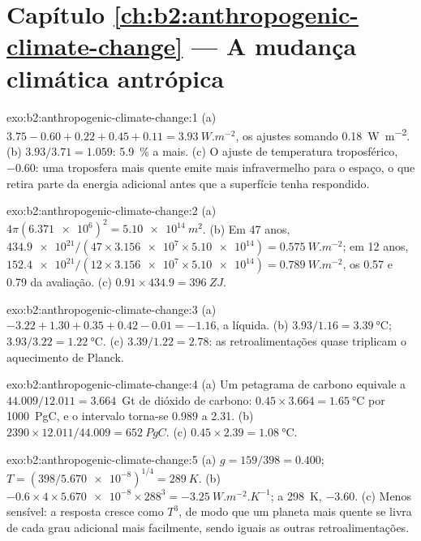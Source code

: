 \section*{Capítulo \ref{ch:b2:anthropogenic-climate-change} --- A mudança climática antrópica}

\begin{solution}{exo:b2:anthropogenic-climate-change:1}
(a) $3.75 - 0.60 + 0.22 + 0.45 + 0.11 = \qty{3.93}{W.m^{-2}}$, os ajustes somando
\qty{0.18}{W.m^{-2}}. (b) $3.93/3.71 = 1.059$: \qty{5.9}{\percent} a mais. (c) O ajuste de temperatura
troposférico, $-0.60$: uma troposfera mais quente emite mais infravermelho para o espaço, o que retira
parte da energia adicional antes que a superfície tenha respondido.
\end{solution}

\begin{solution}{exo:b2:anthropogenic-climate-change:2}
(a) $4\pi(\num{6.371e6})^2 = \qty{5.10e14}{m^2}$. (b) Em 47 anos, $\num{434.9e21}/(47 \times
\num{3.156e7} \times \num{5.10e14}) = \qty{0.575}{W.m^{-2}}$; em 12 anos, $\num{152.4e21}/(12
\times \num{3.156e7} \times \num{5.10e14}) = \qty{0.789}{W.m^{-2}}$, os 0.57 e 0.79 da
avaliação. (c) $0.91 \times 434.9 = \qty{396}{ZJ}$.
\end{solution}

\begin{solution}{exo:b2:anthropogenic-climate-change:3}
(a) $-3.22 + 1.30 + 0.35 + 0.42 - 0.01 = \num{-1.16}$, a líquida. (b) $3.93/1.16 =
\qty{3.39}{\celsius}$; $3.93/3.22 = \qty{1.22}{\celsius}$. (c) $3.39/1.22 = 2.78$: as retroalimentações
quase triplicam o aquecimento de Planck.
\end{solution}

\begin{solution}{exo:b2:anthropogenic-climate-change:4}
(a) Um petagrama de carbono equivale a $44.009/12.011 = 3.664$~Gt de dióxido de carbono: $0.45 \times 3.664 =
\qty{1.65}{\celsius}$ por \qty{1000}{PgC}, e o intervalo torna-se 0.989 a 2.31. (b) $2390 \times
12.011/44.009 = \qty{652}{PgC}$. (c) $0.45 \times 2.39 = \qty{1.08}{\celsius}$.
\end{solution}

\begin{solution}{exo:b2:anthropogenic-climate-change:5}
(a) $g = 159/398 = 0.400$; $T = (398/\num{5.670e-8})^{1/4} = \qty{289}{K}$. (b) $-0.6 \times 4
\times \num{5.670e-8} \times 288^3 = \qty{-3.25}{W.m^{-2}.K^{-1}}$; a \qty{298}{K}, $-3.60$.
(c) Menos sensível: a resposta cresce como $T^3$, de modo que um planeta mais quente se livra de cada grau adicional mais
facilmente, sendo iguais as outras retroalimentações.
\end{solution}

